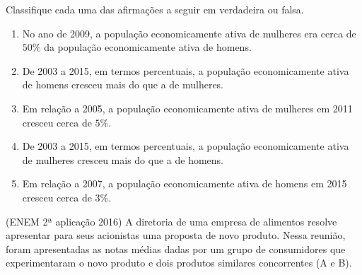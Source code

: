 Classifique cada uma das afirmações a seguir em verdadeira ou falsa.
\begin{enumerate}
\item {} 
No ano de 2009, a população economicamente ativa de mulheres era cerca de $50\%$ da população economicamente ativa de homens.

\item {} 
De 2003 a 2015, em termos percentuais, a população economicamente ativa de homens cresceu mais do que a de mulheres.

\item {} 
Em relação a 2005, a população economicamente ativa de mulheres em 2011 cresceu cerca de $5\%$.

\item {} 
De 2003 a 2015, em termos percentuais, a população economicamente ativa de mulheres cresceu mais do que a de homens.

\item {} 
Em relação a 2007, a população economicamente ativa de homens em 2015 cresceu cerca de $3\%$.

\end{enumerate}

\item (ENEM 2ª aplicação 2016)  A diretoria de uma empresa de alimentos resolve apresentar para seus acionistas uma proposta de novo produto. Nessa reunião, foram apresentadas as notas médias dadas por um grupo de consumidores que experimentaram o novo produto e dois produtos similares concorrentes (A e B).

